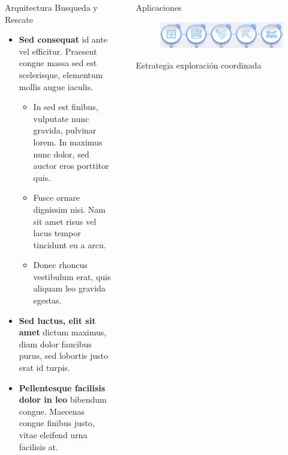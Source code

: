 \documentclass[final]{beamer}
\newlength{\sepwidth}
\newlength{\colwidth}
\newcommand{\separatorcolumn}{\begin{column}{\sepwidth}\end{column}}
\begin{document}
\begin{frame}[t]
\begin{columns}[t]
\begin{column}{\colwidth}
\begin{block}{\color{teal}Arquitectura Busqueda y Rescate}
    \begin{itemize}
    \item \textbf{Sed consequat} id ante vel efficitur. Praesent congue massa
      sed est scelerisque, elementum mollis augue iaculis.
      \begin{itemize}
      \item In sed est finibus, vulputate
        nunc gravida, pulvinar lorem. In maximus nunc dolor, sed auctor eros
        porttitor quis.
      \item Fusce ornare dignissim nisi. Nam sit amet risus vel lacus
        tempor tincidunt eu a arcu.
      \item Donec rhoncus vestibulum erat, quis aliquam leo
        gravida egestas.
      \end{itemize}
    \item \textbf{Sed luctus, elit sit amet} dictum maximus, diam dolor
      faucibus purus, sed lobortis justo erat id turpis.
    \item \textbf{Pellentesque facilisis dolor in leo} bibendum congue.
      Maecenas congue finibus justo, vitae eleifend urna facilisis at.
    \end{itemize}
    
  \end{block}

\end{column}

\separatorcolumn

\begin{column}{\colwidth}
  
  \begin{block}{\color{teal}Aplicaciones}

    \begin{figure}
      \centering
      \includegraphics[width=30cm]{images/drone_usos.png}
      \end{figure}
    
    
  \end{block}

  \begin{block}{\color{teal}Estrategia exploración coordinada}


\end{block}
\end{column}
\end{columns}
\end{frame}
\end{document}
